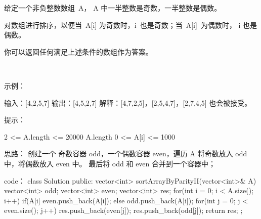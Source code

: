 给定一个非负整数数组 A， A 中一半整数是奇数，一半整数是偶数。

对数组进行排序，以便当 A[i] 为奇数时，i 也是奇数；当 A[i] 为偶数时， i 也是偶数。

你可以返回任何满足上述条件的数组作为答案。

 

示例：

输入：[4,2,5,7]
输出：[4,5,2,7]
解释：[4,7,2,5]，[2,5,4,7]，[2,7,4,5] 也会被接受。
 

提示：

2 <= A.length <= 20000
A.length %
0 <= A[i] <= 1000

































思路：
创建一个 奇数容器 odd，一个偶数容器 even，遍历 A 将奇数放入 odd 中，将偶数放入 even 中。
最后将 odd 和 even 合并到一个容器中；



























code：
class Solution {
public:
    vector<int> sortArrayByParityII(vector<int>& A) {
        vector<int> odd;
        vector<int> even;
        vector<int> res;
        for(int i = 0; i < A.size(); i++)
        {
            if(A[i] %
                even.push_back(A[i]);
            else odd.push_back(A[i]);
        }
        for(int j = 0; j < even.size(); j++)
        {
            res.push_back(even[j]);
            res.push_back(odd[j]);
        }
        return res;
    }
};